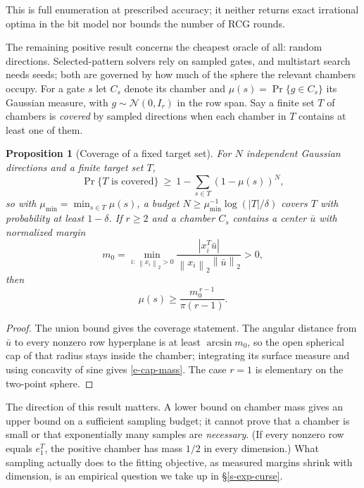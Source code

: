 \documentclass[12pt]{article}
\theoremstyle{plain}
\newtheorem{proposition}[theorem]{Proposition}
\theoremstyle{definition}
\newcommand{\norm}[1]{\left\lVert #1\right\rVert}
\begin{document}
This is full enumeration at prescribed accuracy; it neither returns exact
irrational optima in the bit model nor bounds the number of RCG rounds.

The remaining positive result concerns the cheapest oracle of all: random
directions. Selected-pattern solvers \citep{mishkin2022fast,kim2024sampling}
rely on sampled gates, and multistart search needs seeds; both are governed by
how much of the sphere the relevant chambers occupy. For a gate $s$ let $C_s$
denote its chamber and $\mu(s)=\Pr\{g\in C_s\}$ its Gaussian measure, with
$g\sim\mathcal N(0,I_r)$ in the row span. Say a finite set $T$ of chambers is
\emph{covered} by sampled directions when each chamber in $T$ contains at
least one of them.

\begin{proposition}[Coverage of a fixed target set]\label{p-coverage}
For $N$ independent Gaussian directions and a finite target set $T$,
\[
 \Pr\{T\text{ is covered}\}\ \ge\ 1-\sum_{s\in T}(1-\mu(s))^N ,
\]
so with $\mu_{\min}=\min_{s\in T}\mu(s)$, a budget
$N\ge\mu_{\min}^{-1}\log(|T|/\delta)$ covers $T$ with probability at least
$1-\delta$. If $r\ge2$ and a chamber $C_s$ contains a center $\bar u$ with
normalized margin
\[
 m_0=\min_{i:\,\norm{x_i}_2>0}
 \frac{|x_i^T\bar u|}{\norm{x_i}_2\norm{\bar u}_2}>0,
\]
then
\begin{equation}\label{e-cap-mass}
 \mu(s)\ge\frac{m_0^{\,r-1}}{\pi(r-1)} .
\end{equation}
\end{proposition}

\begin{proof}
The union bound gives the coverage statement. The angular distance from
$\bar u$ to every nonzero row hyperplane is at least $\arcsin m_0$, so the
open spherical cap of that radius stays inside the chamber; integrating its
surface measure and using concavity of sine gives \eqref{e-cap-mass}. The
case $r=1$ is elementary on the two-point sphere.
\end{proof}

The direction of this result matters. A lower bound on chamber mass gives an
upper bound on a sufficient sampling budget; it cannot prove that a chamber is
small or that exponentially many samples are \emph{necessary}. (If every
nonzero row equals $e_1^T$, the positive chamber has mass $1/2$ in every
dimension.) What sampling actually does to the fitting objective, as measured
margins shrink with dimension, is an empirical question we take up in
\S\ref{s-exp-curse}.
\end{document}
